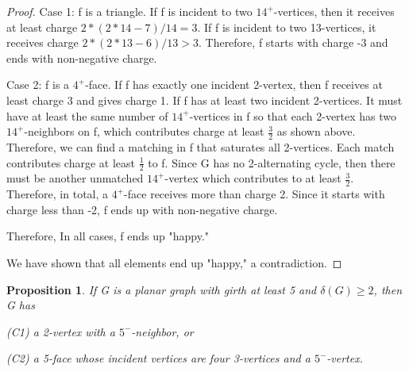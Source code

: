 \documentclass[a4paper, 11pt]{article} %
\newtheorem{proposition}{Proposition}[section]
\begin{document}
\begin{proof}
Case 1: f is a triangle. If f is incident to two $14^{+}$-vertices, then it receives at least charge $2*(2*14-7)/14 = 3$. If f is incident to two 13-vertices, it receives charge $2*(2*13-6)/13 > 3$. Therefore, f starts with charge -3 and ends with non-negative charge.

Case 2: f is a $4^{+}$-face. If f has exactly one incident 2-vertex, then f receives at least charge 3 and gives charge 1. If f has at least two incident 2-vertices. It must have at least the same number of $14^{+}$-vertices in f so that each 2-vertex has two $14^{+}$-neighbors on f, which contributes charge at least $\frac{3}{2}$ as shown above. Therefore, we can find a matching in f that saturates all 2-vertices. Each match contributes charge at least $\frac{1}{2}$ to f. Since G has no 2-alternating cycle, then there must be another unmatched  $14^{+}$-vertex which contributes to at least $\frac{3}{2}$. Therefore, in total, a $4^{+}$-face receives more than charge 2. Since it starts with charge less than -2, f ends up with non-negative charge. 

Therefore, In all cases, f ends up "happy." 

We have shown that all elements end up "happy," a contradiction.
\end{proof}


\begin{proposition}
\cite{cranston2011linear} If G is a planar graph with girth at least 5 and $\delta(G) \geq 2$, then G has 

(C1) a 2-vertex with a $5^{-}$-neighbor, or 

(C2) a 5-face whose incident vertices are four 3-vertices and a $5^{-}$-vertex.
\end{proposition} 
\end{document}
